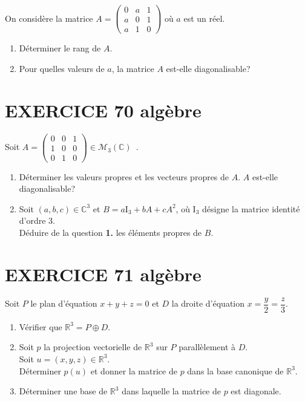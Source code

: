 \documentclass[10pt,oneside]{article}
\begin{document}
\begin{flushleft}
On considère la matrice $A=\begin{pmatrix}
0&a&1\\
a&0&1\\
a&1&0
\end{pmatrix}$ où $a$ est un réel.
\begin{enumerate}
\item
Déterminer le rang de $A$.
\item
Pour quelles valeurs de $a$, la matrice $A$ est-elle diagonalisable? 
\end{enumerate}


\section*{EXERCICE 70 \: algèbre  }

Soit $A=\begin{pmatrix}
0 & 0 & 1 \\ 
1 & 0 & 0 \\ 
0 & 1 & 0
\end{pmatrix} \in \mathcal{M}_{3}\left( \mathbb{C}\right)$~.

\begin{enumerate}
\item D\'{e}terminer les valeurs propres et les vecteurs propres de $A$. $A$ est-elle diagonalisable?
\item Soit $\left( a,b,c\right) \in \mathbb{C}^{3}$ et $B=a\mathrm{I}_{3}+bA+cA^{2}$, où $\mathrm{I}_3$ désigne la matrice identité d'ordre 3.\\ D\'{e}duire de la question \textbf{1.} les \'{e}l\'{e}ments propres de $B$.
\end{enumerate}

\section*{EXERCICE 71 \: algèbre}
Soit  $P$ le plan d'équation $x+y+z=0$ et  $D$ la droite d'équation $x=\dfrac{y}{2}=\dfrac{z}{3}$.
\begin{enumerate}
\item
Vérifier que $\mathbb{R}^3=P\oplus D$.\:\:\:\:
\item
Soit $p$ la projection vectorielle de  $\mathbb{R}^3$ sur  $P$  parallèlement à  $D$.\\
Soit $u=(x,y,z)\in\mathbb{R}^3$.\\
Déterminer $p(u)$ et donner la matrice de $p$ dans la base canonique de $\mathbb{R}^3$.\:\:\:\:
\item
Déterminer une base de $\mathbb{R}^3$ dans laquelle la matrice de $p$ est diagonale.\:\:\:\:


\end{enumerate}
\end{flushleft}
\end{document}

